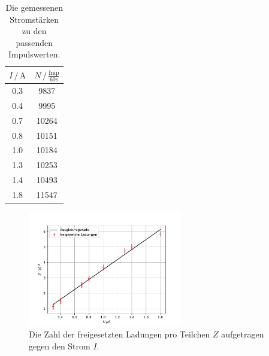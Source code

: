 \begin{table}
  \centering
  \caption{Die gemessenen Stromstärken zu den passenden Impulswerten.}
  \begin{tabular}[t]{cc}
    \toprule
    $I \, /\, \si{\A}$ & $N \,/\, \frac{\text{Imp}}{\si{60\second}}$\\
    \midrule
    0.3 & 9837 \\
    0.4 & 9995 \\
    0.7 & 10264 \\
    0.8 & 10151 \\
    1.0 & 10184 \\
    1.3 & 10253 \\
    1.4 & 10493 \\
    1.8 & 11547 \\
    \bottomrule
    \end{tabular}
  \label{tab:strom}
\end{table}

\begin{figure}
  \centering
  \includegraphics[width=0.6\textwidth]{content/data/zaehlstrom.pdf}
  \caption{Die Zahl der freigesetzten Ladungen pro Teilchen $Z$ aufgetragen gegen den Strom $I$.}
  \label{fig:z}
\end{figure}